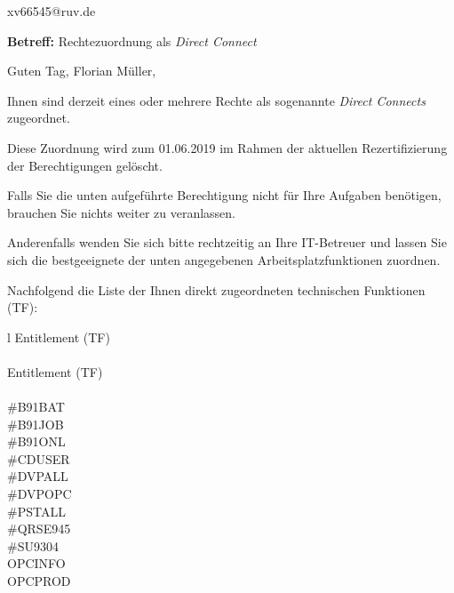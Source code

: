 \documentclass[a4paper,landscape,12pt]{letter}
\begin{document}
\begin{letter}{xv66545@ruv.de\hfill \break}
\begin{normalsize}
	\opening{\textbf{Betreff:} Rechtezuordnung als \emph{Direct Connect}}
	\begin{normalsize} \hfill
	\end{normalsize}

	\begin{normalsize}
		Guten Tag, 
	Florian Müller, \hfill \break
	\end{normalsize}
	\end{normalsize}
	
\begin{normalsize}
	Ihnen sind derzeit eines oder mehrere Rechte als sogenannte \emph{Direct Connects} zugeordnet.
	
	Diese Zuordnung wird zum 01.06.2019 im Rahmen der aktuellen Rezertifizierung der Berechtigungen gelöscht.
	
	Falls Sie die unten aufgeführte Berechtigung nicht für Ihre Aufgaben benötigen, 
	brauchen Sie nichts weiter zu veranlassen.
	
	Anderenfalls wenden Sie sich bitte rechtzeitig an Ihre IT-Betreuer 
	und lassen Sie sich die bestgeeignete der unten angegebenen Arbeitsplatzfunktionen zuordnen.
	\end{normalsize}
	
\begin{normalsize}
	Nachfolgend die Liste der Ihnen direkt zugeordneten technischen Funktionen (TF):

	\begin{longtable}{l}
		Entitlement (TF) \\ \hline
		\endfirsthead
		\\\hline
		Entitlement (TF) \\ \hline
		\endhead %
		\multicolumn{1}{r@{}}{Fortsetzung \ldots}\\
		\endfoot
		\hline
		\endlastfoot
	\#B91BAT\\\#B91JOB\\\#B91ONL\\\#CDUSER\\\#DVPALL\\\#DVPOPC\\\#PSTALL\\\#QRSE945\\\#SU9304\\OPCINFO\\OPCPROD\\
	\end{longtable}
	\end{normalsize}
	

\end{letter}
\end{document}
